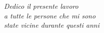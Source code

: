 \thispagestyle{empty}
\vspace*{5cm}
\parbox[r]{0.95\textwidth}{
\itshape
\raggedleft
Dedico il presente lavoro
\\
a tutte le persone che mi sono
\\
state vicine durante questi anni
}